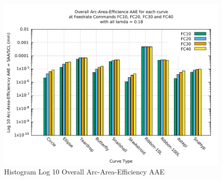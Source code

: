 \clearpage
\pagebreak
\begin{landscape}
	
\begin{figure}
\centering
\caption  {Histogram Log 10 Overall Arc-Area-Efficiency AAE}
\label{img-Histogram Log 10 Overall Arc-Area-Efficiency AAE}
\includegraphics[width=1.30\textwidth]{Chap4/Overall/Histogram/AAE-img-Histo-Log-10-Overall-Arc-Area-Efficiency.pdf} 
\end{figure}
	
\end{landscape}
\clearpage
\pagebreak
